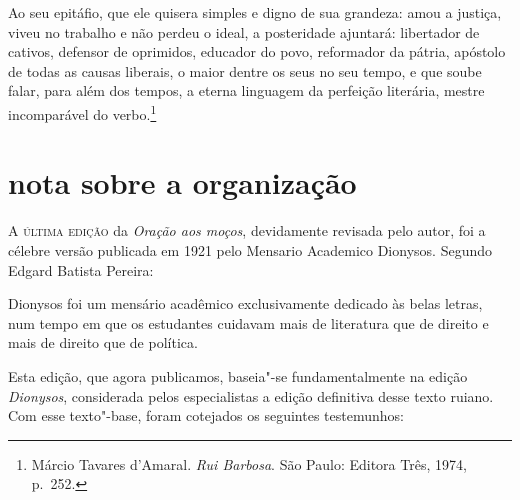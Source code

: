 \begin{hedraquote}
Ao seu epitáfio, que ele quisera simples e digno de sua
grandeza: amou a justiça, viveu no trabalho e não perdeu o ideal, a
posteridade ajuntará: libertador de cativos, defensor de oprimidos,
educador do povo, reformador da pátria, apóstolo de todas as causas
liberais, o maior dentre os seus no seu tempo, e que soube falar, para
além dos tempos, a eterna linguagem da perfeição literária, mestre
incomparável do verbo.\footnote{ Márcio Tavares d'Amaral. \textit{Rui Barbosa}. 
São Paulo: Editora Três, 1974, p.~252.}
\end{hedraquote}


\chapter[Nota sobre a organização, por Marcelo Módolo]{nota sobre a organização}
\vskip-1cm


\textsc{A última edição} da \textit{Oração aos moços}, 
devidamente revisada pelo autor, foi a célebre versão
publicada em 1921 pelo Mensario Academico Dionysos. Segundo Edgard
Batista Pereira: 

\begin{hedraquote}
Dionysos foi um mensário acadêmico exclusivamente dedicado às belas 
letras, num tempo em que os estudantes cuidavam mais de literatura 
que de direito e mais de direito que de política.
\end{hedraquote}

Esta edição, que agora publicamos, baseia"-se fundamentalmente na edição
\textit{Dionysos}, considerada pelos especialistas a edição
definitiva desse texto ruiano. Com esse texto"-base, foram cotejados os
seguintes testemunhos: 

